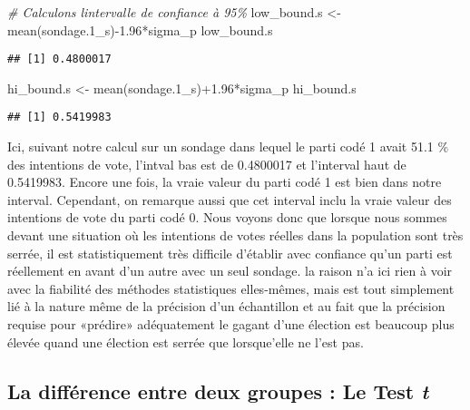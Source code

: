 \documentclass[
]{book}
\newenvironment{Shaded}{\begin{snugshade}}{\end{snugshade}}
\newcommand{\CommentTok}[1]{\textcolor[rgb]{0.56,0.35,0.01}{\textit{#1}}}
\newcommand{\FloatTok}[1]{\textcolor[rgb]{0.00,0.00,0.81}{#1}}
\newcommand{\FunctionTok}[1]{\textcolor[rgb]{0.00,0.00,0.00}{#1}}
\newcommand{\NormalTok}[1]{#1}
\newcommand{\OtherTok}[1]{\textcolor[rgb]{0.56,0.35,0.01}{#1}}
\newcommand{\SpecialCharTok}[1]{\textcolor[rgb]{0.00,0.00,0.00}{#1}}
\begin{document}
\begin{Shaded}
\begin{Highlighting}[]
\CommentTok{\# Calculons l\textquotesingle{}intervalle de confiance à 95\%}
\NormalTok{low\_bound.s }\OtherTok{\textless{}{-}} \FunctionTok{mean}\NormalTok{(sondage}\FloatTok{.1}\NormalTok{\_s)}\SpecialCharTok{{-}}\FloatTok{1.96}\SpecialCharTok{*}\NormalTok{sigma\_p}
\NormalTok{low\_bound.s}
\end{Highlighting}
\end{Shaded}

\begin{verbatim}
## [1] 0.4800017
\end{verbatim}

\begin{Shaded}
\begin{Highlighting}[]
\NormalTok{hi\_bound.s }\OtherTok{\textless{}{-}} \FunctionTok{mean}\NormalTok{(sondage}\FloatTok{.1}\NormalTok{\_s)}\SpecialCharTok{+}\FloatTok{1.96}\SpecialCharTok{*}\NormalTok{sigma\_p}
\NormalTok{hi\_bound.s}
\end{Highlighting}
\end{Shaded}

\begin{verbatim}
## [1] 0.5419983
\end{verbatim}

Ici, suivant notre calcul sur un sondage dans lequel le parti codé 1 avait 51.1 \% des intentions de vote, l'intval bas est de 0.4800017 et l'interval haut de 0.5419983. Encore une fois, la vraie valeur du parti codé 1 est bien dans notre interval. Cependant, on remarque aussi que cet interval inclu la vraie valeur des intentions de vote du parti codé 0. Nous voyons donc que lorsque nous sommes devant une situation où les intentions de votes réelles dans la population sont très serrée, il est statistiquement très difficile d'établir avec confiance qu'un parti est réellement en avant d'un autre avec un seul sondage. la raison n'a ici rien à voir avec la fiabilité des méthodes statistiques elles-mêmes, mais est tout simplement lié à la nature même de la précision d'un échantillon et au fait que la précision requise pour «prédire» adéquatement le gagant d'une élection est beaucoup plus élevée quand une élection est serrée que lorsque'elle ne l'est pas.

\hypertarget{la-diffuxe9rence-entre-deux-groupes-le-test-t}{%
\subsection{\texorpdfstring{La différence entre deux groupes : Le Test \emph{t}}{La différence entre deux groupes : Le Test t}}\label{la-diffuxe9rence-entre-deux-groupes-le-test-t}}
\end{document}
